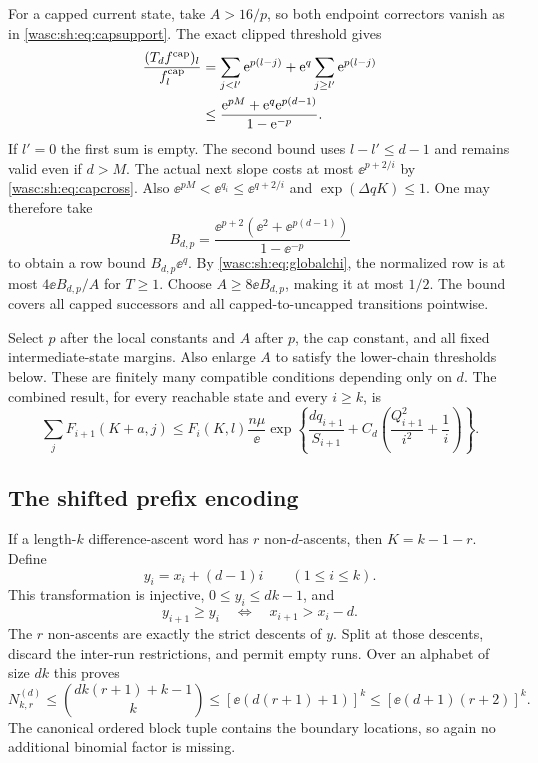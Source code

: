 \documentclass[11pt,a4paper]{article}
\theoremstyle{remark}\newtheorem{remark}[theorem]{Remark}
\numberwithin{equation}{section}
\begin{document}
For a capped current state, take $A>16/p$, so both endpoint correctors vanish as in \eqref{wasc:sh:eq:capsupport}. The exact clipped threshold gives
\begin{align}\label{wasc:sh:eq:dcaprow}
\frac{(T_d f^{\rm cap})_l}{f_l^{\rm cap}}
&=\sum_{j<l'}\mathrm e^{p(l-j)}+\mathrm e^q\sum_{j\ge l'}\mathrm e^{p(l-j)}\notag\\
&\le\frac{\mathrm e^{pM}+\mathrm e^q\mathrm e^{p(d-1)}}{1-\mathrm e^{-p}}.
\end{align}
If $l'=0$ the first sum is empty. The second bound uses $l-l'\le d-1$ and remains valid even if $d>M$. The actual next slope costs at most $\ee^{p+2/i}$ by \eqref{wasc:sh:eq:capcross}. Also $\ee^{pM}<\ee^{q_i}\le\ee^{q+2/i}$ and $\exp(\Delta qK)\le1$. One may therefore take
\[
B_{d,p}=\frac{\ee^{p+2}(\ee^2+\ee^{p(d-1)})}{1-\ee^{-p}}
\]
to obtain a row bound $B_{d,p}\ee^q$. By \eqref{wasc:sh:eq:globalchi}, the normalized row is at most $4\ee B_{d,p}/A$ for $T\ge1$. Choose $A\ge8\ee B_{d,p}$, making it at most $1/2$. The bound covers all capped successors and all capped-to-uncapped transitions pointwise.

Select $p$ after the local constants and $A$ after $p$, the cap constant, and all fixed intermediate-state margins. Also enlarge $A$ to satisfy the lower-chain thresholds below. These are finitely many compatible conditions depending only on $d$. The combined result, for every reachable state and every $i\ge k$, is
\begin{equation}\label{wasc:sh:eq:dglobal}
\sum_j F_{i+1}(K+a,j)\le F_i(K,l)\frac{n\mu}{\ee}
\exp\left\{\frac{dq_{i+1}}{S_{i+1}}+C_d\left(\frac{Q_{i+1}^2}{i^2}+\frac1i\right)\right\}.
\end{equation}

\subsection{The shifted prefix encoding}
If a length-$k$ difference-ascent word has $r$ non-$d$-ascents, then $K=k-1-r$. Define
\[
y_i=x_i+(d-1)i\qquad(1\le i\le k).
\]
This transformation is injective, $0\le y_i\le dk-1$, and
\[
y_{i+1}\ge y_i\quad\Longleftrightarrow\quad x_{i+1}>x_i-d.
\]
The $r$ non-ascents are exactly the strict descents of $y$. Split at those descents, discard the inter-run restrictions, and permit empty runs. Over an alphabet of size $dk$ this proves
\begin{equation}\label{wasc:sh:eq:dprefixcount}
N_{k,r}^{(d)}\le\binom{dk(r+1)+k-1}{k}
\le[\ee(d(r+1)+1)]^k\le[\ee(d+1)(r+2)]^k.
\end{equation}
The canonical ordered block tuple contains the boundary locations, so again no additional binomial factor is missing.
\end{document}
